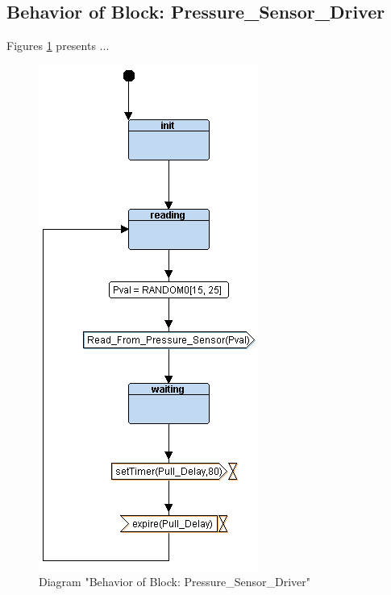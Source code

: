 \subsection{Behavior of Block: Pressure\_Sensor\_Driver}
Figures \ref{fig:PressureSensorDriverPressureSensorDriver22} presents ...
\begin{figure}[htb]
\centering
\includegraphics[width=\textwidth]{img_2_2.png}
\caption{Diagram "Behavior of Block: Pressure\_Sensor\_Driver"}
\label{fig:PressureSensorDriverPressureSensorDriver22}
\end{figure}

